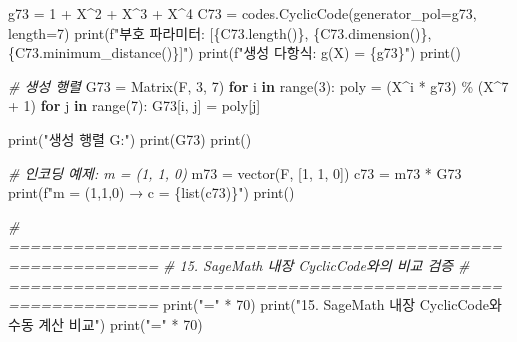 \documentclass[
  oneside]{article}
\newenvironment{Shaded}{}{}
\newcommand{\BuiltInTok}[1]{\textcolor[rgb]{0.00,0.50,0.00}{#1}}
\newcommand{\CommentTok}[1]{\textcolor[rgb]{0.38,0.63,0.69}{\textit{#1}}}
\newcommand{\ControlFlowTok}[1]{\textcolor[rgb]{0.00,0.44,0.13}{\textbf{#1}}}
\newcommand{\DecValTok}[1]{\textcolor[rgb]{0.25,0.63,0.44}{#1}}
\newcommand{\KeywordTok}[1]{\textcolor[rgb]{0.00,0.44,0.13}{\textbf{#1}}}
\newcommand{\NormalTok}[1]{#1}
\newcommand{\OperatorTok}[1]{\textcolor[rgb]{0.40,0.40,0.40}{#1}}
\newcommand{\SpecialCharTok}[1]{\textcolor[rgb]{0.25,0.44,0.63}{#1}}
\newcommand{\SpecialStringTok}[1]{\textcolor[rgb]{0.73,0.40,0.53}{#1}}
\newcommand{\StringTok}[1]{\textcolor[rgb]{0.25,0.44,0.63}{#1}}
\begin{document}
\begin{Shaded}
\begin{Highlighting}[]
\NormalTok{g73 }\OperatorTok{=} \DecValTok{1} \OperatorTok{+}\NormalTok{ X}\OperatorTok{\^{}}\DecValTok{2} \OperatorTok{+}\NormalTok{ X}\OperatorTok{\^{}}\DecValTok{3} \OperatorTok{+}\NormalTok{ X}\OperatorTok{\^{}}\DecValTok{4}
\NormalTok{C73 }\OperatorTok{=}\NormalTok{ codes.CyclicCode(generator\_pol}\OperatorTok{=}\NormalTok{g73, length}\OperatorTok{=}\DecValTok{7}\NormalTok{)}
\BuiltInTok{print}\NormalTok{(}\SpecialStringTok{f"부호 파라미터: [}\SpecialCharTok{\{}\NormalTok{C73}\SpecialCharTok{.}\NormalTok{length()}\SpecialCharTok{\}}\SpecialStringTok{, }\SpecialCharTok{\{}\NormalTok{C73}\SpecialCharTok{.}\NormalTok{dimension()}\SpecialCharTok{\}}\SpecialStringTok{, }\SpecialCharTok{\{}\NormalTok{C73}\SpecialCharTok{.}\NormalTok{minimum\_distance()}\SpecialCharTok{\}}\SpecialStringTok{]"}\NormalTok{)}
\BuiltInTok{print}\NormalTok{(}\SpecialStringTok{f"생성 다항식: g(X) = }\SpecialCharTok{\{}\NormalTok{g73}\SpecialCharTok{\}}\SpecialStringTok{"}\NormalTok{)}
\BuiltInTok{print}\NormalTok{()}

\CommentTok{\# 생성 행렬}
\NormalTok{G73 }\OperatorTok{=}\NormalTok{ Matrix(F, }\DecValTok{3}\NormalTok{, }\DecValTok{7}\NormalTok{)}
\ControlFlowTok{for}\NormalTok{ i }\KeywordTok{in} \BuiltInTok{range}\NormalTok{(}\DecValTok{3}\NormalTok{):}
\NormalTok{    poly }\OperatorTok{=}\NormalTok{ (X}\OperatorTok{\^{}}\NormalTok{i }\OperatorTok{*}\NormalTok{ g73) }\OperatorTok{\%}\NormalTok{ (X}\OperatorTok{\^{}}\DecValTok{7} \OperatorTok{+} \DecValTok{1}\NormalTok{)}
    \ControlFlowTok{for}\NormalTok{ j }\KeywordTok{in} \BuiltInTok{range}\NormalTok{(}\DecValTok{7}\NormalTok{):}
\NormalTok{        G73[i, j] }\OperatorTok{=}\NormalTok{ poly[j]}

\BuiltInTok{print}\NormalTok{(}\StringTok{"생성 행렬 G:"}\NormalTok{)}
\BuiltInTok{print}\NormalTok{(G73)}
\BuiltInTok{print}\NormalTok{()}

\CommentTok{\# 인코딩 예제: m = (1, 1, 0)}
\NormalTok{m73 }\OperatorTok{=}\NormalTok{ vector(F, [}\DecValTok{1}\NormalTok{, }\DecValTok{1}\NormalTok{, }\DecValTok{0}\NormalTok{])}
\NormalTok{c73 }\OperatorTok{=}\NormalTok{ m73 }\OperatorTok{*}\NormalTok{ G73}
\BuiltInTok{print}\NormalTok{(}\SpecialStringTok{f"m = (1,1,0) → c = }\SpecialCharTok{\{}\BuiltInTok{list}\NormalTok{(c73)}\SpecialCharTok{\}}\SpecialStringTok{"}\NormalTok{)}
\BuiltInTok{print}\NormalTok{()}

\CommentTok{\# ============================================================}
\CommentTok{\# 15. SageMath 내장 CyclicCode와의 비교 검증}
\CommentTok{\# ============================================================}
\BuiltInTok{print}\NormalTok{(}\StringTok{"="} \OperatorTok{*} \DecValTok{70}\NormalTok{)}
\BuiltInTok{print}\NormalTok{(}\StringTok{"15. SageMath 내장 CyclicCode와 수동 계산 비교"}\NormalTok{)}
\BuiltInTok{print}\NormalTok{(}\StringTok{"="} \OperatorTok{*} \DecValTok{70}\NormalTok{)}


\end{Highlighting}
\end{Shaded}
\end{document}
